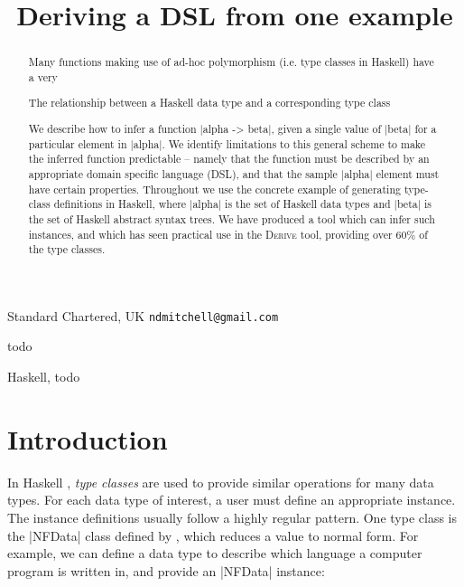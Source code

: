 \documentclass[preprint]{sigplanconf}
\newcommand{\derive}{\textsc{Derive}}
\begin{document}
\copyrightdata{[to be supplied]}

\titlebanner{\today{} - \currenttime{}}        %
\preprintfooter{}   %

\title{Deriving a DSL from one example}

           {Standard Chartered, UK}
           {\verb"ndmitchell@gmail.com"}

\maketitle

\begin{abstract}
Many functions making use of ad-hoc polymorphism (i.e. type classes in Haskell) have a very 

The relationship between a Haskell data type and a corresponding type class

We describe how to infer a function |alpha -> beta|, given a single value of |beta| for a particular element in |alpha|. We identify limitations to this general scheme to make the inferred function predictable -- namely that the function must be described by an appropriate domain specific language (DSL), and that the sample |alpha| element must have certain properties. Throughout we use the concrete example of generating type-class definitions in Haskell, where |alpha| is the set of Haskell data types and |beta| is the set of Haskell abstract syntax trees. We have produced a tool which can infer such instances, and which has seen practical use in the {\derive} tool, providing over 60\% of the type classes.
\end{abstract}


\terms
todo

\keywords
Haskell, todo

\section{Introduction}

In Haskell \cite{haskell}, \textit{type classes} \cite{wadler:type_classes} are used to provide similar operations for many data types. For each data type of interest, a user must define an appropriate instance. The instance definitions usually follow a highly regular pattern. One type class is the |NFData| class defined by \citet{trinder:strategies}, which reduces a value to normal form. For example, we can define a data type to describe which language a computer program is written in, and provide an |NFData| instance:
\end{document}

